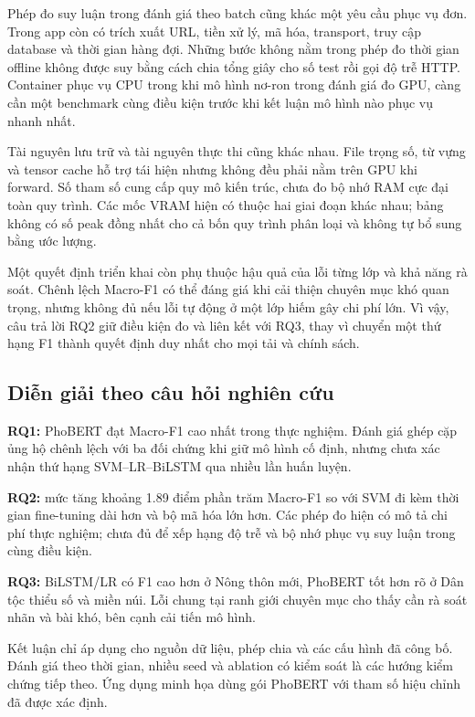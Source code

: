 Phép đo suy luận trong đánh giá theo batch cũng khác một yêu cầu phục vụ đơn. Trong app còn có trích xuất URL, tiền xử lý, mã hóa, transport, truy cập database và thời gian hàng đợi. Những bước không nằm trong phép đo thời gian offline không được suy bằng cách chia tổng giây cho số test rồi gọi độ trễ HTTP. Container phục vụ CPU trong khi mô hình nơ-ron trong đánh giá đo GPU, càng cần một benchmark cùng điều kiện trước khi kết luận mô hình nào phục vụ nhanh nhất.

Tài nguyên lưu trữ và tài nguyên thực thi cũng khác nhau. File trọng số, từ vựng và tensor cache hỗ trợ tái hiện nhưng không đều phải nằm trên GPU khi forward. Số tham số cung cấp quy mô kiến trúc, chưa đo bộ nhớ RAM cực đại toàn quy trình. Các mốc VRAM hiện có thuộc hai giai đoạn khác nhau; bảng không có số peak đồng nhất cho cả bốn quy trình phân loại và không tự bổ sung bằng ước lượng.

Một quyết định triển khai còn phụ thuộc hậu quả của lỗi từng lớp và khả năng rà soát. Chênh lệch Macro-F1 có thể đáng giá khi cải thiện chuyên mục khó quan trọng, nhưng không đủ nếu lỗi tự động ở một lớp hiếm gây chi phí lớn. Vì vậy, câu trả lời RQ2 giữ điều kiện đo và liên kết với RQ3, thay vì chuyển một thứ hạng F1 thành quyết định duy nhất cho mọi tải và chính sách.

\FloatBarrier

\subsection{Diễn giải theo câu hỏi nghiên cứu}

\textbf{RQ1:} PhoBERT đạt Macro-F1 cao nhất trong thực nghiệm. Đánh giá ghép cặp ủng hộ chênh lệch với ba đối chứng khi giữ mô hình cố định, nhưng chưa xác nhận thứ hạng SVM--LR--BiLSTM qua nhiều lần huấn luyện.

\textbf{RQ2:} mức tăng khoảng 1.89 điểm phần trăm Macro-F1 so với SVM đi kèm thời gian fine-tuning dài hơn và bộ mã hóa lớn hơn. Các phép đo hiện có mô tả chi phí thực nghiệm; chưa đủ để xếp hạng độ trễ và bộ nhớ phục vụ suy luận trong cùng điều kiện.

\textbf{RQ3:} BiLSTM/LR có F1 cao hơn ở Nông thôn mới, PhoBERT tốt hơn rõ ở Dân tộc thiểu số và miền núi. Lỗi chung tại ranh giới chuyên mục cho thấy cần rà soát nhãn và bài khó, bên cạnh cải tiến mô hình.

Kết luận chỉ áp dụng cho nguồn dữ liệu, phép chia và các cấu hình đã công bố. Đánh giá theo thời gian, nhiều seed và ablation có kiểm soát là các hướng kiểm chứng tiếp theo. Ứng dụng minh họa dùng gói PhoBERT với tham số hiệu chỉnh đã được xác định.
